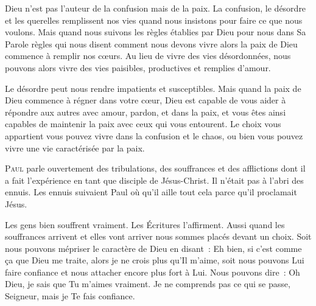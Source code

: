 
Dieu n'est pas l'auteur de la confusion mais de la paix.
 La confusion, le désordre et les querelles remplissent nos vies
 quand nous insistons pour faire ce que nous voulons.
 Mais quand nous suivons les règles établies par Dieu pour nous dans Sa Parole
 \ocadr règles qui nous disent comment nous devons vivre \fcadr{}
 alors la paix de Dieu commence à remplir nos c\oe{}urs.
 Au lieu de vivre des vies désordonnées,
 nous pouvons alors vivre des vies paisibles, productives et remplies d'amour.

Le désordre peut nous rendre impatients et susceptibles.
 Mais quand la paix de Dieu commence à régner dans votre c\oe{}ur,
 Dieu est capable de vous aider à répondre aux autres avec amour,
 pardon, et dans la paix, et vous êtes ainsi capables de maintenir
 la paix avec ceux qui vous entourent.
 Le choix vous appartient \ocadr vous pouvez vivre dans la confusion et le chaos,
 ou bien vous pouvez vivre une vie caractérisée par la paix.

\dvrule






\lettrine{P}{aul} parle ouvertement des tribulations,
 des souffrances et des afflictions dont il a fait
 l'expérience en tant que disciple de Jésus-Christ.
 Il n'était pas à l'abri des ennuis.
 Les ennuis suivaient Paul où qu'il aille
 \ocadr tout cela parce qu'il proclamait Jésus.


Les \og gens bien \fg{} souffrent vraiment.
 Les Écritures l'affirment.
 Aussi quand les souf\-fran\-ces arrivent
 \ocadr et elles vont arriver \fcadr{}
 nous sommes placés devant un choix.
 Soit nous pouvons mépriser le caractère de Dieu
 en disant~: 
 \og Eh bien, si c'est comme ça que Dieu me traite,
 alors je ne crois plus qu'Il m'aime, \fg{}
 soit nous pouvons Lui faire confiance et nous attacher
 encore plus fort à Lui.
 Nous pouvons dire~: 
 \og Oh Dieu, je sais que Tu m'aimes vraiment.
 Je ne comprends pas ce qui se passe, Seigneur,
 mais je Te fais confiance. \fg{}

